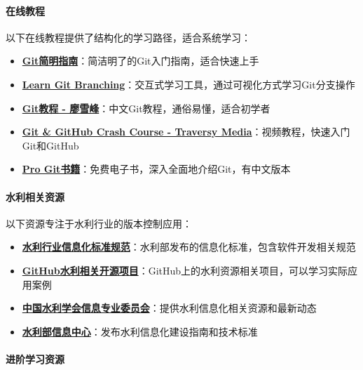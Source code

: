 \paragraph{在线教程}\label{ux5728ux7ebfux6559ux7a0b}

以下在线教程提供了结构化的学习路径，适合系统学习：

\begin{itemize}
\tightlist
\item
  \textbf{\href{http://rogerdudler.github.io/git-guide/index.zh.html}{Git简明指南}}：简洁明了的Git入门指南，适合快速上手
\item
  \textbf{\href{https://learngitbranching.js.org/}{Learn Git
  Branching}}：交互式学习工具，通过可视化方式学习Git分支操作
\item
  \textbf{\href{https://www.liaoxuefeng.com/wiki/896043488029600}{Git教程
  - 廖雪峰}}：中文Git教程，通俗易懂，适合初学者
\item
  \textbf{\href{https://www.youtube.com/watch?v=SWYqp7iY_Tc}{Git \&
  GitHub Crash Course - Traversy Media}}：视频教程，快速入门Git和GitHub
\item
  \textbf{\href{https://git-scm.com/book/zh/v2}{Pro
  Git书籍}}：免费电子书，深入全面地介绍Git，有中文版本
\end{itemize}

\paragraph{水利相关资源}\label{ux6c34ux5229ux76f8ux5173ux8d44ux6e90}

以下资源专注于水利行业的版本控制应用：

\begin{itemize}
\tightlist
\item
  \textbf{\href{http://www.mwr.gov.cn/zwgk/zfxxgkml/201705/t20170510_955445.html}{水利行业信息化标准规范}}：水利部发布的信息化标准，包含软件开发相关规范
\item
  \textbf{\href{https://github.com/topics/water-resources}{GitHub水利相关开源项目}}：GitHub上的水利资源相关项目，可以学习实际应用案例
\item
  \textbf{\href{http://www.cws.net.cn/}{中国水利学会信息专业委员会}}：提供水利信息化相关资源和最新动态
\item
  \textbf{\href{http://xxzx.mwr.gov.cn/}{水利部信息中心}}：发布水利信息化建设指南和技术标准
\end{itemize}

\paragraph{进阶学习资源}\label{ux8fdbux9636ux5b66ux4e60ux8d44ux6e90}

